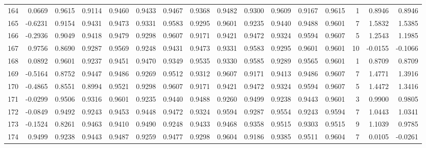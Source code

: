 \begin{tabular}{lrrrrrrrrrrrrrrr}
164 &      0.0669 &  0.9615 &  0.9114 &  0.9460 &  0.9433 &  0.9467 &  0.9368 &  0.9482 &  0.9300 &  0.9609 &   0.9167 &     0.9615 &      1 &                    0.8946 &                     0.8946 \\
165 &     -0.6231 &  0.9154 &  0.9431 &  0.9473 &  0.9331 &  0.9583 &  0.9295 &  0.9601 &  0.9235 &  0.9440 &   0.9488 &     0.9601 &      7 &                    1.5832 &                     1.5385 \\
166 &     -0.2936 &  0.9049 &  0.9418 &  0.9479 &  0.9298 &  0.9607 &  0.9171 &  0.9421 &  0.9472 &  0.9324 &   0.9594 &     0.9607 &      5 &                    1.2543 &                     1.1985 \\
167 &      0.9756 &  0.8690 &  0.9287 &  0.9569 &  0.9248 &  0.9431 &  0.9473 &  0.9331 &  0.9583 &  0.9295 &   0.9601 &     0.9601 &     10 &                   -0.0155 &                    -0.1066 \\
168 &      0.0892 &  0.9601 &  0.9237 &  0.9451 &  0.9470 &  0.9349 &  0.9535 &  0.9330 &  0.9585 &  0.9289 &   0.9565 &     0.9601 &      1 &                    0.8709 &                     0.8709 \\
169 &     -0.5164 &  0.8752 &  0.9447 &  0.9486 &  0.9269 &  0.9512 &  0.9312 &  0.9607 &  0.9171 &  0.9413 &   0.9486 &     0.9607 &      7 &                    1.4771 &                     1.3916 \\
170 &     -0.4865 &  0.8551 &  0.8994 &  0.9521 &  0.9298 &  0.9607 &  0.9171 &  0.9421 &  0.9472 &  0.9324 &   0.9594 &     0.9607 &      5 &                    1.4472 &                     1.3416 \\
171 &     -0.0299 &  0.9506 &  0.9316 &  0.9601 &  0.9235 &  0.9440 &  0.9488 &  0.9260 &  0.9499 &  0.9238 &   0.9443 &     0.9601 &      3 &                    0.9900 &                     0.9805 \\
172 &     -0.0849 &  0.9492 &  0.9243 &  0.9453 &  0.9448 &  0.9472 &  0.9324 &  0.9594 &  0.9287 &  0.9554 &   0.9243 &     0.9594 &      7 &                    1.0443 &                     1.0341 \\
173 &     -0.1524 &  0.8261 &  0.9463 &  0.9410 &  0.9490 &  0.9248 &  0.9433 &  0.9468 &  0.9358 &  0.9515 &   0.9303 &     0.9515 &      9 &                    1.1039 &                     0.9785 \\
174 &      0.9499 &  0.9238 &  0.9443 &  0.9487 &  0.9259 &  0.9477 &  0.9298 &  0.9604 &  0.9186 &  0.9385 &   0.9511 &     0.9604 &      7 &                    0.0105 &                    -0.0261 \\

\end{tabular}
